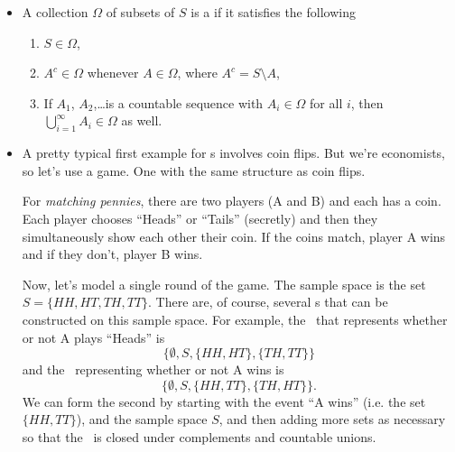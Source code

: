\begin{itemize}
\item %
  \begin{defn} A collection $\Omega$ of subsets of $S$ is a
    \emph{\sigmaalgebra} if it satisfies the following
    \begin{enumerate}
    \item $S \in \Omega$,
    \item $A^c \in \Omega$ whenever $A \in \Omega$, where $A^c = S \setminus A$,
    \item If $A_1$, $A_2$,\dots is a countable sequence with $A_i \in \Omega$ for
      all $i$, then $\bigcup_{i=1}^\infty A_i \in \Omega$ as well.
    \end{enumerate}
  \end{defn}

\item A pretty typical first example for \sigmaalgebra s involves coin
  flips.  But we're economists, so let's use a game.  One with the
  same structure as coin flips.
  \begin{ex}
    For \emph{matching pennies}, there are two players (A and B) and
    each has a coin.  Each player chooses ``Heads'' or ``Tails''
    (secretly) and then they simultaneously show each other their
    coin.  If the coins match, player A wins and if they don't, player
    B wins.

    Now, let's model a single round of the game.  The sample space is
    the set $S = \{HH, HT, TH, TT\}$. There are, of course, several \sigmaalgebra s that can be
    constructed on this sample space.  For example, the \sigmaalgebra\ that
    represents whether or not A plays ``Heads'' is
    \begin{equation*}
      \{\emptyset, S, \{HH,HT\}, \{TH,TT\}\}
    \end{equation*}
    and the \sigmaalgebra\ representing whether or not A wins is
    \begin{equation*}
      \{\emptyset, S, \{HH,TT\}, \{TH,HT\}\}.
    \end{equation*}
    We can form the second \sigmaalgebra by starting with the event ``A
    wins'' (i.e. the set $\{HH, TT\}$), and the sample space $S$, and
    then adding more sets as necessary so that the \sigmaalgebra\ is closed
    under complements and countable unions.
  \end{ex}


\end{itemize}
